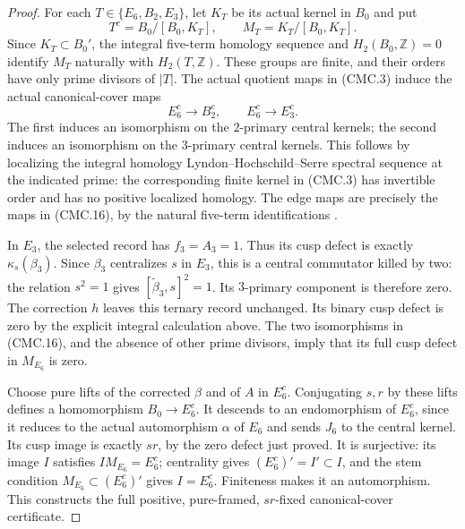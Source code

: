 \begin{proof}
For each $T\in\{E_6,B_2,E_3\}$, let $K_T$ be its actual kernel in
$B_0$ and put
\[
 T^c=B_0/[B_0,K_T],\qquad M_T=K_T/[B_0,K_T].
 \tag{CMC.15}
\]
Since $K_T\subset B_0'$, the integral five-term homology sequence and
$H_2(B_0,\mathbb Z)=0$ identify $M_T$ naturally with
$H_2(T,\mathbb Z)$.  These groups are finite, and their orders have
only prime divisors of $|T|$.  The actual quotient maps in (CMC.3)
induce the actual canonical-cover maps
\[
 E_6^c\longrightarrow B_2^c,
 \qquad E_6^c\longrightarrow E_3^c.
 \tag{CMC.16}
\]
The first induces an isomorphism on the $2$-primary central kernels;
the second induces an isomorphism on the $3$-primary central kernels.
This follows by localizing the integral homology
Lyndon--Hochschild--Serre spectral sequence at the indicated prime:
the corresponding finite kernel in (CMC.3) has invertible order and
has no positive localized homology.  The edge maps are precisely the
maps in (CMC.16), by the natural five-term identifications
\cite[Theorem 6.5.8, Corollary 6.5.10, Theorem 6.8.2 and
Section 6.8.3]{CA_WeibelHA1994}.

In $E_3$, the selected record has $f_3=A_3=1$.  Thus its cusp defect
is exactly $\kappa_s(\beta_3)$.  Since $\beta_3$ centralizes $s$ in
$E_3$, this is a central commutator killed by two: the relation $s^2=1$
gives $[\widetilde\beta_3,s]^2=1$.  Its $3$-primary component is
therefore zero.  The correction $h$ leaves this ternary record unchanged.
Its binary cusp defect is zero by the
explicit integral calculation above.  The two isomorphisms in
(CMC.16), and the absence of other prime divisors, imply that its full
cusp defect in $M_{E_6}$ is zero.

Choose pure lifts of the corrected $\beta$ and of $A$ in $E_6^c$.
Conjugating $s,r$ by these lifts defines a homomorphism
$B_0\to E_6^c$.  It descends to an endomorphism of $E_6^c$, since it
reduces to the actual automorphism $\alpha$ of $E_6$ and sends $J_6$
to the central kernel.  Its cusp image is exactly $sr$, by the zero
defect just proved.  It is surjective: its image $I$ satisfies
$I M_{E_6}=E_6^c$; centrality gives
$(E_6^c)'=I'\subset I$, and the stem condition
$M_{E_6}\subset(E_6^c)'$ gives $I=E_6^c$.  Finiteness makes it an
automorphism.  This constructs the full positive, pure-framed,
$sr$-fixed canonical-cover certificate.


\end{proof}
